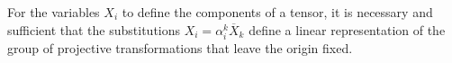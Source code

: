 For the variables $X_i$ to define the components of a tensor, it is necessary and sufficient that the substitutions $X_i = \alpha^k_i \overline X_k$ define a linear representation of the group of projective transformations that leave the origin fixed.













































































































































